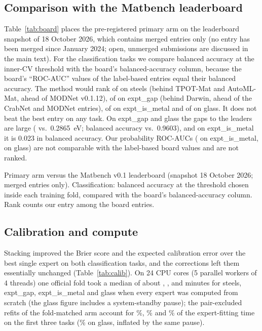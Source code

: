 \subsection{Comparison with the Matbench leaderboard}
Table~\ref{tab:board} places the pre-registered primary arm on the leaderboard snapshot of 18 October 2026, which contains merged entries only (no entry has been merged since January 2024; open, unmerged submissions are discussed in the main text).
For the classification tasks we compare balanced accuracy at the inner-CV threshold with the board's balanced-accuracy column, because the board's ``ROC-AUC'' values of the label-based entries equal their balanced accuracy.
The method would rank \SteelsRank{} of \SteelsNEntries{} on steels (behind TPOT-Mat and AutoML-Mat, ahead of MODNet v0.1.12), \GapRank{} of \GapNEntries{} on expt\_gap (behind Darwin, ahead of the CrabNet and MODNet entries), \MetalRank{} of \MetalNEntries{} on expt\_is\_metal and \GlassRank{} of \GlassNEntries{} on glass.
It does not beat the best entry on any task.
On expt\_gap and glass the gaps to the leaders are large (\GapStackLocal{} vs.\ 0.2865~eV; balanced accuracy \GlassStackLocalBA{} vs.\ 0.9603), and on expt\_is\_metal it is 0.023 in balanced accuracy.
Our probability ROC-AUCs (\MetalAUCprob{} on expt\_is\_metal, \GlassAUCprob{} on glass) are not comparable with the label-based board values and are not ranked.

\begin{table}[t]
\centering
\caption{Primary arm versus the Matbench v0.1 leaderboard (snapshot 18 October 2026; merged entries only). Classification: balanced accuracy at the threshold chosen inside each training fold, compared with the board's balanced-accuracy column. Rank counts our entry among the board entries.}
\label{tab:board}
\begin{adjustbox}{max width=\textwidth}

\end{adjustbox}
\end{table}

\subsection{Calibration and compute}
Stacking improved the Brier score and the expected calibration error over the best single expert on both classification tasks, and the corrections left them essentially unchanged (Table~\ref{tab:calib}).
On 24 CPU cores (5 parallel workers of 4 threads) one official fold took a median of about \SteelsScratchMin, \GapScratchMin, \MetalScratchMin{} and \GlassScratchMin{} minutes for steels, expt\_gap, expt\_is\_metal and glass when every expert was computed from scratch (the glass figure includes a system-standby pause); the pair-excluded refits of the fold-matched arm account for \SteelsPairShare\%, \GapPairShare\% and \MetalPairShare\% of the expert-fitting time on the first three tasks (\GlassPairShare\% on glass, inflated by the same pause).

